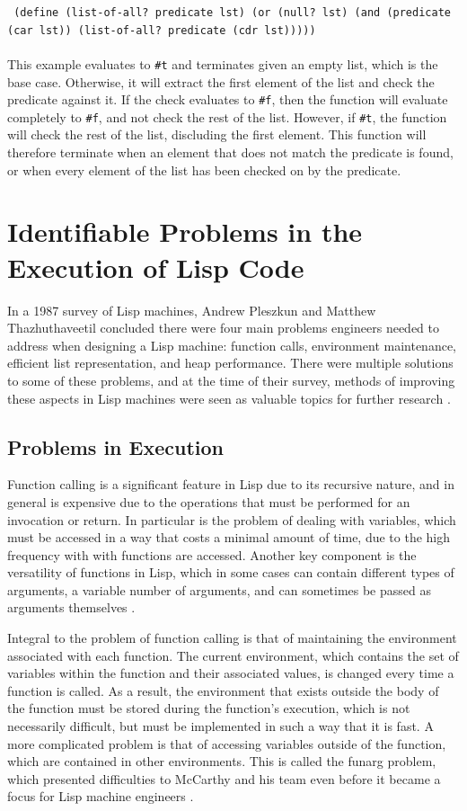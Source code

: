 \documentclass[journal]{IEEEtran}
\begin{document}
\texttt{
	(define (list-of-all? predicate lst)
			(or 
				(null? lst)
				(and (predicate (car lst))
					 (list-of-all? predicate (cdr lst)))))
}\\\\This example evaluates to \texttt{\#t} and terminates given an empty list, which is the base case. Otherwise, it will extract the first element of the list and check the predicate against it. If the check evaluates to \texttt{\#f}, then the function will evaluate completely to \texttt{\#f}, and not check the rest of the list. However, if \texttt{\#t}, the function will check the rest of the list, discluding the first element. This function will therefore terminate when an element that does not match the predicate is found, or when every element of the list has been checked on by the predicate.

\section{Identifiable Problems in the Execution of Lisp Code}
In a 1987 survey of Lisp machines, Andrew Pleszkun and Matthew Thazhuthaveetil concluded there were four main problems engineers needed to address when designing a Lisp machine: function calls, environment maintenance, efficient list representation, and heap performance. There were multiple solutions to some of these problems, and at the time of their survey, methods of improving these aspects in Lisp machines were seen as valuable topics for further research \cite{pt}.

\subsection{Problems in Execution}
Function calling is a significant feature in Lisp due to its recursive nature, and in general is expensive due to the operations that must be performed for an invocation or return. In particular is the problem of dealing with variables, which must be accessed in a way that costs a minimal amount of time, due to the high frequency with with functions are accessed. Another key component is the versatility of functions in Lisp, which in some cases can contain different types of arguments, a variable number of arguments, and can sometimes be passed as arguments themselves \cite{pt}.

Integral to the problem of function calling is that of maintaining the environment associated with each function. The current environment, which contains the set of variables within the function and their associated values, is changed every time a function is called. As a result, the environment that exists outside the body of the function must be stored during the function's execution, which is not necessarily difficult, but must be implemented in such a way that it is fast. A more complicated problem is that of accessing variables outside of the function, which are contained in other environments. This is called the funarg problem, which presented difficulties to McCarthy and his team even before it became a focus for Lisp machine engineers \cite{stoyan, pt}.
\end{document}
